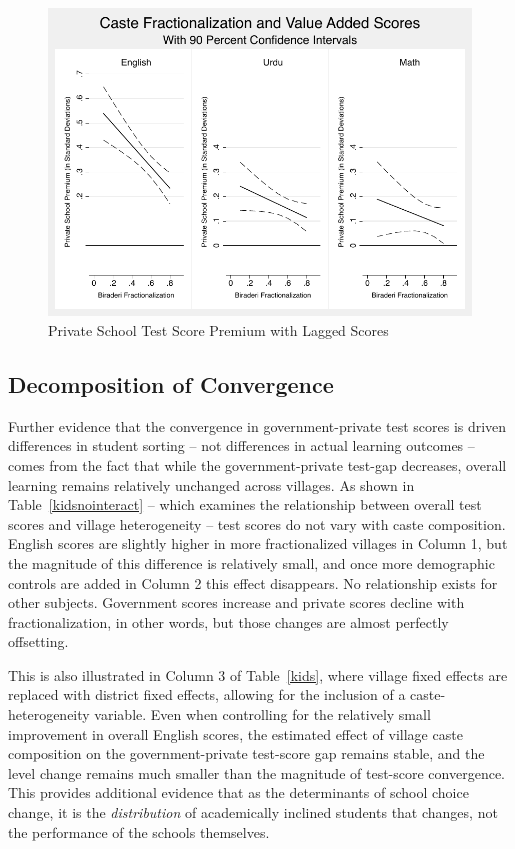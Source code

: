 \documentclass[Eubank_pk_ethnic_sorting.tex]{subfiles}
\begin{document}
\begin{figure}[h]
	\caption{Private School Test Score Premium with Lagged Scores}\label{kidscombined}
	\centering
	\includegraphics[scale=0.8]{../results/kids_combined.pdf}
\end{figure}


\subsection{Decomposition of Convergence}\label{village_level_outcomes}

Further evidence that the convergence in government-private test scores is driven differences in student sorting -- not differences in actual learning outcomes -- comes from the fact that while the government-private test-gap decreases, overall learning remains relatively unchanged across villages. As shown in Table~\ref{kidsnointeract} -- which examines the relationship between overall test scores and village heterogeneity -- test scores do not vary with caste composition. English scores are slightly higher in more fractionalized villages in Column 1, but the magnitude of this difference is relatively small, and once more demographic controls are added in Column 2 this effect disappears. No relationship exists for other subjects. Government scores increase and private scores decline with fractionalization, in other words, but those changes are almost perfectly offsetting. 

This is also illustrated in Column 3 of Table~\ref{kids}, where village fixed effects are replaced with district fixed effects, allowing for the inclusion of a caste-heterogeneity variable. Even when controlling for the relatively small improvement in overall English scores, the estimated effect of village caste composition on the government-private test-score gap remains stable, and the level change remains much smaller than the magnitude of test-score convergence. This provides additional evidence that as the determinants of school choice change, it is the \emph{distribution} of academically inclined students that changes, not the performance of the schools themselves.
\end{document}
